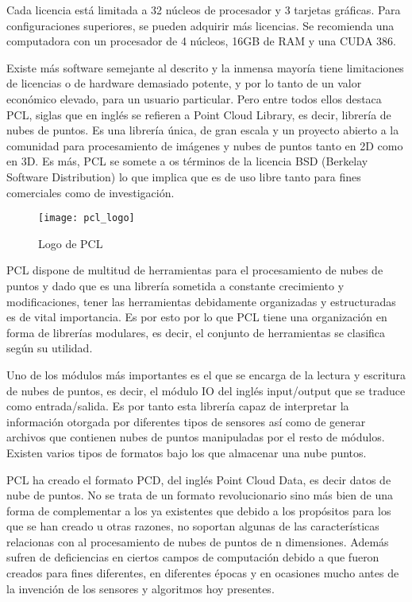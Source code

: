 Cada licencia está limitada a 32 núcleos de procesador y 3 tarjetas gráficas. Para configuraciones superiores, se pueden adquirir más licencias. Se recomienda una computadora con un procesador de 4 núcleos, 16GB de RAM y una CUDA 386.



Existe más software semejante al descrito y la inmensa mayoría tiene limitaciones de licencias o de hardware demasiado potente, y por lo tanto de un valor económico elevado, para un usuario particular. Pero entre todos ellos destaca PCL, siglas que en inglés se refieren a Point Cloud Library, es decir, librería de nubes de puntos. Es una librería única, de gran escala y un proyecto abierto a la comunidad para procesamiento de imágenes y nubes de puntos tanto en 2D como en 3D. Es más, PCL se somete a os términos de la licencia BSD (Berkelay Software Distribution) lo que implica que es de uso libre tanto para fines comerciales como de investigación. 

\begin{figure}
\centering
{}
  \texttt{[image: pcl\_logo]}
  \caption{Logo de PCL}\label{fig:pcl logo}
\endminipage\hfill
\end{figure}

PCL dispone de multitud de herramientas para el procesamiento de nubes de puntos y dado que es una librería sometida a constante crecimiento y modificaciones, tener las herramientas debidamente organizadas y estructuradas es de vital importancia. Es por esto por lo que PCL tiene una organización en forma de librerías modulares, es decir, el conjunto de herramientas se clasifica según su utilidad.

Uno de los módulos más importantes es el que se encarga de la lectura y escritura de nubes de puntos, es decir, el módulo IO del inglés input/output que se traduce como entrada/salida. Es por tanto esta librería capaz de interpretar la información otorgada por diferentes tipos de sensores así como de generar archivos que contienen nubes de puntos manipuladas por el resto de módulos.
Existen varios tipos de formatos bajo los que almacenar una nube puntos.

PCL ha creado el formato PCD, del inglés Point Cloud Data, es decir datos de nube de puntos. No se trata de un formato revolucionario sino más bien de una forma de complementar a los ya existentes que debido a los propósitos para los que se han creado u otras razones, no soportan algunas de las características relacionas con al procesamiento de nubes de puntos de n dimensiones. Además sufren de deficiencias en ciertos campos de computación debido a que fueron creados para fines diferentes, en diferentes épocas y en ocasiones mucho antes de la invención de los sensores y algoritmos hoy presentes.


